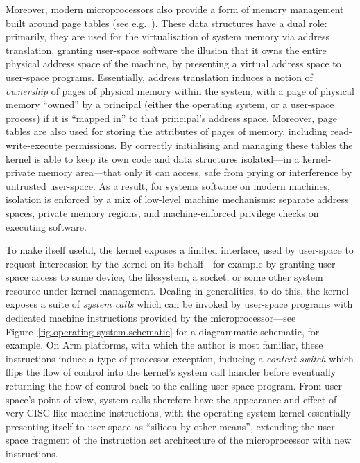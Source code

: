 \documentclass[a4paper, UKenglish, cleveref, autoref, thm-restate, colorlinks]{lipics-v2021}
\begin{document}
Moreover, modern microprocessors also provide a form of memory management built around page tables (see e.g.~\cite{arm-vmsa}).
These data structures have a dual role: primarily, they are used for the virtualisation of system memory via address translation, granting user-space software the illusion that it owns the entire physical address space of the machine, by presenting a virtual address space to user-space programs.
Essentially, address translation induces a notion of \emph{ownership} of pages of physical memory within the system, with a page of physical memory ``owned'' by a principal (either the operating system, or a user-space process) if it is ``mapped in'' to that principal's address space.
Moreover, page tables are also used for storing the attributes of pages of memory, including read-write-execute permissions.
By correctly initialising and managing these tables the kernel is able to keep its own code and data structures isolated---in a kernel-private memory area---that only it can access, safe from prying or interference by untrusted user-space.
As a result, for systems software on modern machines, isolation is enforced by a mix of low-level machine mechanisms: separate address spaces, private memory regions, and machine-enforced privilege checks on executing software.

To make itself useful, the kernel exposes a limited interface, used by user-space to request intercession by the kernel on its behalf---for example by granting user-space access to some device, the filesystem, a socket, or some other system resource under kernel management.
Dealing in generalities, to do this, the kernel exposes a suite of \emph{system calls} which can be invoked by user-space programs with dedicated machine instructions provided by the microprocessor---see Figure~\ref{fig.operating-system.schematic} for a diagrammatic schematic, for example.
On Arm platforms, with which the author is most familiar, these instructions induce a type of processor exception, inducing a \emph{context switch} which flips the flow of control into the kernel's system call handler before eventually returning the flow of control back to the calling user-space program.
From user-space's point-of-view, system calls therefore have the appearance and effect of very CISC-like machine instructions, with the operating system kernel essentially presenting itself to user-space as ``silicon by other means'', extending the user-space fragment of the instruction set architecture of the microprocessor with new instructions.
\end{document}
